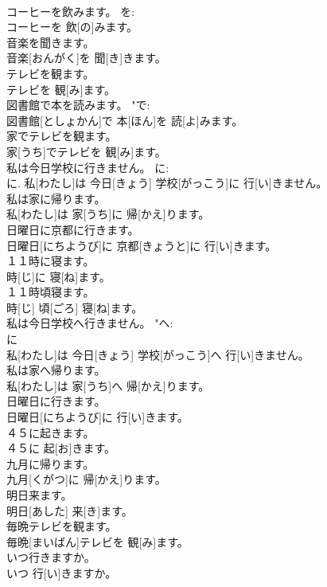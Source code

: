 \documentclass[8pt]{extreport}
\begin{document}
\begin{CJK}{UTF8}{min}
\\	コーヒーを飲みます。	を: 
\\	コーヒーを 飲[の]みます。	
\\	音楽を聞きます。	
\\	音楽[おんがく]を 聞[き]きます。	
\\	テレビを観ます。	
\\	テレビを 観[み]ます。	
\\	図書館で本を読みます。	"で: 
\\	図書館[としょかん]で 本[ほん]を 読[よ]みます。	
\\	家でテレビを観ます。	
\\	家[うち]でテレビを 観[み]ます。	
\\	私は今日学校に行きません。	に: 
\\	に.	私[わたし]は 今日[きょう] 学校[がっこう]に 行[い]きません。	
\\	私は家に帰ります。	
\\	私[わたし]は 家[うち]に 帰[かえ]ります。	
\\	日曜日に京都に行きます。	
\\	日曜日[にちようび]に 京都[きょうと]に 行[い]きます。	
\\	１１時に寝ます。	
\\	時[じ]に 寝[ね]ます。	
\\	１１時頃寝ます。	
\\	時[じ] 頃[ごろ] 寝[ね]ます。	
\\	私は今日学校へ行きません。	"へ: 
\\	に 
\\	私[わたし]は 今日[きょう] 学校[がっこう]へ 行[い]きません。	
\\	私は家へ帰ります。	
\\	私[わたし]は 家[うち]へ 帰[かえ]ります。	
\\	日曜日に行きます。	
\\	日曜日[にちようび]に 行[い]きます。	
\\	４５に起きます。	
\\	４５に 起[お]きます。	
\\	九月に帰ります。	
\\	九月[くがつ]に 帰[かえ]ります。	
\\	明日来ます。	
\\	明日[あした] 来[き]ます。	
\\	毎晩テレビを観ます。	
\\	毎晩[まいばん]テレビを 観[み]ます。	
\\	いつ行きますか。	
\\	いつ 行[い]きますか。	

\end{CJK}
\end{document}
